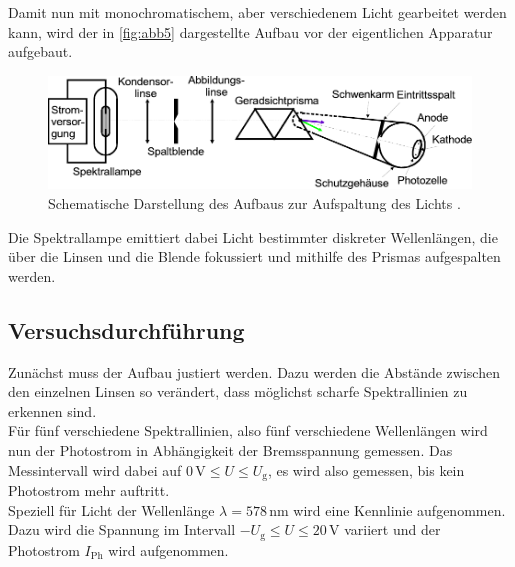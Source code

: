 Damit nun mit monochromatischem, aber verschiedenem Licht gearbeitet werden kann, wird der in \autoref{fig:abb5} dargestellte Aufbau vor der eigentlichen Apparatur aufgebaut.

\begin{figure}[H]
    \centering
    \includegraphics{figures/Abb5.pdf}
    \caption{Schematische Darstellung des Aufbaus zur Aufspaltung des Lichts \cite{ap10}.}
    \label{fig:abb5}
\end{figure}

Die Spektrallampe emittiert dabei Licht bestimmter diskreter Wellenlängen, die über die Linsen und die Blende fokussiert und mithilfe des Prismas aufgespalten werden.


\subsection{Versuchsdurchführung}

Zunächst muss der Aufbau justiert werden.
Dazu werden die Abstände zwischen den einzelnen Linsen so verändert, dass möglichst scharfe Spektrallinien zu erkennen sind. \\

Für fünf verschiedene Spektrallinien, also fünf verschiedene Wellenlängen wird nun der Photostrom in Abhängigkeit der Bremsspannung gemessen.
Das Messintervall wird dabei auf $0 \,\unit{\volt} \leq U \leq U_\text{g}$, es wird also gemessen, bis kein Photostrom mehr auftritt. \\

Speziell für Licht der Wellenlänge $\lambda = 578 \, \unit{\nano\meter}$ wird eine Kennlinie aufgenommen.
Dazu wird die Spannung im Intervall $-U_\text{g} \leq U \leq 20 \,\unit{\volt}$ variiert und der Photostrom $I_\text{Ph}$ wird aufgenommen.

